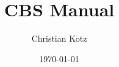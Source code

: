 \documentclass{memoir}
\title{CBS Manual}
\author{Christian Kotz}
\date{\today}
\begin{document}

\autocite{ISO/IEC2020}

\printbibliography
\end{document}
